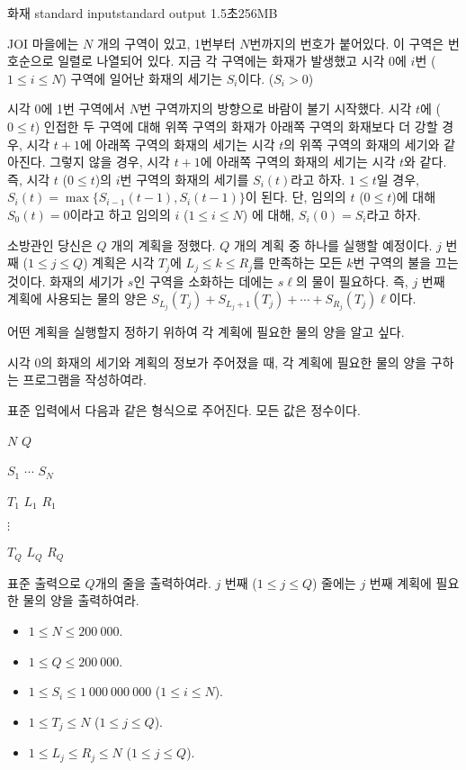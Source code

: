 \begin{problem}{화재}
	{standard input}{standard output}
	{1.5초}{256MB}{}
	
	JOI 마을에는 $N$ 개의 구역이 있고, 1번부터 $N$번까지의 번호가 붙어있다. 이 구역은 번호순으로 일렬로 나열되어 있다. 지금 각 구역에는 화재가 발생했고 시각 0에 $i$번 ($1 \le i \le N$) 구역에 일어난 화재의 세기는 $S_i$이다. ($S_i > 0$)
	
	시각 0에 1번 구역에서 $N$번 구역까지의 방향으로 바람이 불기 시작했다. 시각 $t$에 ($ 0 \le t$) 인접한 두 구역에 대해 위쪽 구역의 화재가 아래쪽 구역의 화재보다 더 강할 경우, 시각 $t+1$에 아래쪽 구역의 화재의 세기는 시각 $t$의 위쪽 구역의 화재의 세기와 같아진다. 그렇지 않을 경우, 시각 $t+1$에 아래쪽 구역의 화재의 세기는 시각 $t$와 같다. 즉, 시각 $t$ ($0 \le t$)의 $i$번 구역의 화재의 세기를 $S_i(t)$라고 하자. $1 \le t$일 경우, $S_i(t) = \max\{S_{i-1}(t-1), S_i(t-1)\}$이 된다. 단, 임의의 $t$ ($0 \le t$)에 대해 $S_0(t) = 0$이라고 하고 임의의 $i$ ($1 \le i \le N$) 에 대해, $S_i(0) = S_i$라고 하자.
	
	소방관인 당신은 $Q$ 개의 계획을 정했다. $Q$ 개의 계획 중 하나를 실행할 예정이다. $j$ 번째 ($1 \le j \le Q$) 계획은 시각 $T_j$에 $L_j \le k \le R_j$를 만족하는 모든 $k$번 구역의 불을 끄는 것이다. 화재의 세기가 $s$인 구역을 소화하는 데에는 $s\ell$의 물이 필요하다. 즉, $j$ 번째 계획에 사용되는 물의 양은 $S_{L_j}(T_j) + S_{L_j+1}(T_j) + \cdots + S_{R_j} (T_j) \ell$이다.
	
	어떤 계획을 실행할지 정하기 위하여 각 계획에 필요한 물의 양을 알고 싶다.
	
	시각 0의 화재의 세기와 계획의 정보가 주어졌을 때, 각 계획에 필요한 물의 양을 구하는 프로그램을 작성하여라.
	
	
	\InputFile
	
	표준 입력에서 다음과 같은 형식으로 주어진다. 모든 값은 정수이다.

	$N$ $Q$
	
	$S_1$ $\cdots$ $S_N$
	
	$T_1$ $L_1$ $R_1$
	
	$\vdots$
	
	$T_Q$ $L_Q$ $R_Q$
	
	\OutputFile
	
	표준 출력으로 $Q$개의 줄을 출력하여라. $j$ 번째 ($1 \le j \le Q$) 줄에는 $j$ 번째 계획에 필요한 물의 양을 출력하여라.
	
	\Constraints
	
	\begin{itemize}
	\item $1 \le N \le 200\ 000$.
	\item $1 \le Q \le 200\ 000$.
	\item $1 \le S_i \le 1\ 000\ 000\ 000$ ($1 \le i \le N$).
	\item $1 \le T_j \le N$ ($1 \le j \le Q$).
	\item $1 \le L_j \le R_j \le N$ ($1 \le j \le Q$).
	

\end{itemize}
\end{problem}
